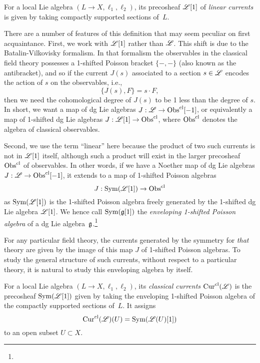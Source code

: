 \begin{dfn}
For a local Lie algebra $(L\to X, \ell_1,\ell_2)$, its precosheaf $\mathscr L[1]$ of {\em linear currents} is given by taking compactly supported sections of~$L$.
\end{dfn}

There are a number of features of this definition that may seem peculiar on first acquaintance.
First, we work with $\mathscr L[1]$ rather than $\mathscr L$.
This shift is due to the Batalin-Vilkovisky formalism. 
In that formalism the observables in the classical field theory possesses a 1-shifted Poisson bracket $\{-,-\}$ (also known as the antibracket), and so if the current $J(s)$ associated to a section $s \in \mathscr L$ encodes the action of $s$ on the observables, i.e.,
\[
\{J(s), F\} = s \cdot F,
\]
then we need the cohomological degree of $J(s)$ to be 1 less than the degree of $s$.
In short, we want a map of dg Lie algebras $J: \mathscr L \to {\rm Obs}^{\rm cl}[-1]$,
or equivalently a map of 1-shifted dg Lie algebras $J: \mathscr L[1] \to {\rm Obs}^{\rm cl}$,
where ${\rm Obs}^{\rm cl}$ denotes the algebra of classical observables.

Second, we use the term ``linear'' here because the product of two such currents is not in $\mathscr L[1]$ itself, 
although such a product will exist in the larger precosheaf ${\rm Obs}^{\rm cl}$ of observables.
In other words, if we have a Noether map of dg Lie algebras $J: \mathscr L \to {\rm Obs}^{\rm cl}[-1]$,
it extends to a map of 1-shifted Poisson algebras
\[
J: {\rm Sym}(\mathscr L[1]) \to {\rm Obs}^{\rm cl}
\]
as ${\rm Sym}(\mathscr L[1])$ is the 1-shifted Poisson algebra freely generated by the 1-shifted dg Lie algebra $\mathscr L[1]$.
We hence call ${\rm Sym}(\mathfrak g[1])$ the {\em enveloping 1-shifted Poisson algebra} of a dg Lie algebra~$\mathfrak g$.\footnote{}

For any particular field theory, the currents generated by the symmetry for {\em that} theory are given by the image of this map $J$ of 1-shifted Poisson algebras.
To study the general structure of such currents, without respect to a particular theory,
it is natural to study this enveloping algebra by itself.

\begin{dfn}\label{dfn: classical currents}
For a local Lie algebra $(L\to X, \ell_1,\ell_2)$, its {\em classical currents} ${\rm Cur}^{\rm cl}(\mathscr L)$ is the precosheaf ${\rm Sym}(\mathscr L[1])$ given by taking the enveloping 1-shifted Poisson algebra of the compactly supported sections of~$L$.
It assigns
\[
{\rm Cur}^{\rm cl}(\mathscr L)(U) = {\rm Sym}(\mathscr L(U)[1])
\]
to an open subset $U \subset X$. 
\end{dfn}

